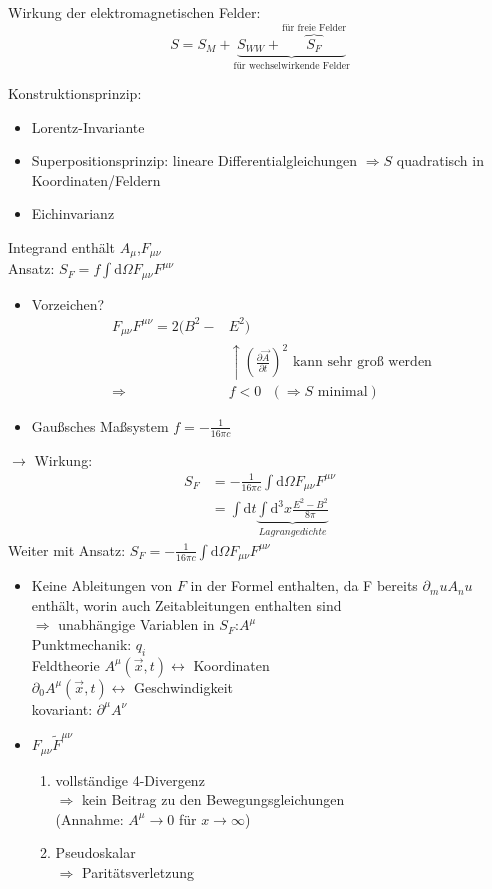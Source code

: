 \documentclass[a4paper]{article}
\begin{document}
Wirkung der elektromagnetischen Felder:
\begin{equation}
S=S_M+\underbrace{S_{WW}+\overbrace{S_F}^{\text{für freie Felder}}}_{\text{für
wechselwirkende Felder}}
\end{equation}

Konstruktionsprinzip:
\begin{itemize}
  \item Lorentz-Invariante
  \item Superpositionsprinzip: lineare Differentialgleichungen $\Rightarrow S$
  quadratisch in Koordinaten/Feldern
  \item Eichinvarianz
\end{itemize}
Integrand enthält $A_\mu$,$F_{\mu\nu}$\\
Ansatz: $S_F=f\int \mathrm{d}\Omega F_{\mu\nu}F^{\mu\nu}$\\
\begin{itemize}
  \item Vorzeichen?
	\begin{align}
	F_{\mu\nu}F^{\mu\nu}=2(B^2-&E^2)\\
	&\uparrow \left(\frac{\partial \vec{A}}{\partial t}\right)^2 \text{ kann sehr
	groß werden}\\
	\Rightarrow &f<0 \text{   } (\Rightarrow S \text{ minimal})
	\end{align}
   \item Gaußsches Maßsystem $f=-\frac{1}{16\pi c}$
\end{itemize}
$\rightarrow$ Wirkung:
\begin{align}
S_F&=-\frac{1}{16\pi c}\int \mathrm{d}\Omega F_{\mu\nu}F^{\mu\nu}\\
&=\int \mathrm{d}t\underbrace{\int \mathrm{d}^3x \frac{E^2-B^2}{8\pi}}_{Lagrangedichte}
\end{align}
Weiter mit Ansatz: $S_F=-\frac{1}{16\pi c}\int \mathrm{d}\Omega F_{\mu\nu}F^{\mu\nu}$
\begin{itemize}
  \item Keine Ableitungen von $F$ in der Formel enthalten, da F bereits
  $\partial_mu A_nu$ enthält, worin auch Zeitableitungen enthalten sind
  \\$\Rightarrow$ unabhängige Variablen in $S_F$:$A^\mu$\\
  Punktmechanik: $q_i$\\ Feldtheorie $A^\mu(\vec{x},t) \leftrightarrow $
  Koordinaten \\ $\partial_0 A^\mu(\vec{x},t) \leftrightarrow $
  Geschwindigkeit \\ kovariant: $\partial^\mu A^\nu$
  \item $F_{\mu\nu}\tilde{F}^{\mu\nu}$ 
  	\begin{enumerate}
	  \item vollständige 4-Divergenz \\ $\Rightarrow$ kein Beitrag zu den
	  Bewegungsgleichungen\\ (Annahme: $A^\mu \rightarrow 0$ für
	  $x\rightarrow\infty$)
	  \item Pseudoskalar\\ $\Rightarrow$ Paritätsverletzung
	\end{enumerate}
\end{itemize}
\end{document}

